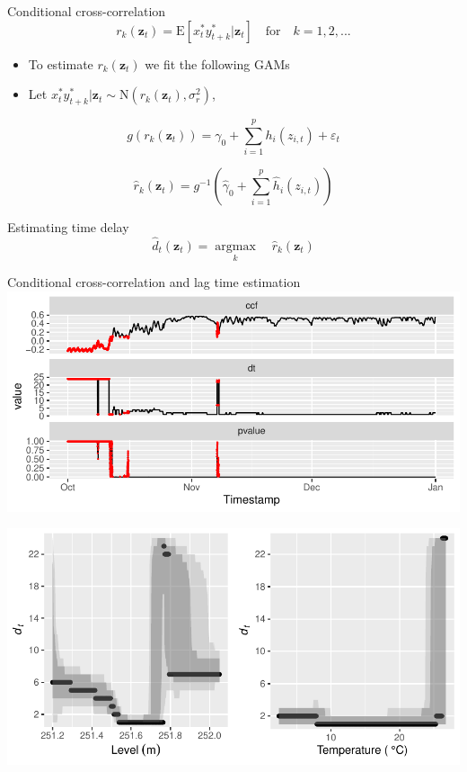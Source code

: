 \documentclass[14pt,ignorenonframetext,compress]{beamer}
\begin{document}
\begin{frame}
\begin{block}{Conditional cross-correlation}
\protect\hypertarget{conditional-cross-correlation}{}
\[
r_k(\bm{z}_t) = \text{E}[x_t^*y^*_{t+k}|\bm{z}_t] \quad \text{for} \quad k = 1,2,...
\]

\begin{itemize}
\item
  To estimate \(r_k(\bm{z}_t)\) we fit the following GAMs
\item
  Let
  \(x_t^*y^*_{t+k}|\bm{z}_t \sim \text{N}(r_k(\bm{z}_t), \sigma_r^2)\),
\end{itemize}

\[
g(r_k(\bm{z}_t)) = \gamma_0 + \sum_{i=1}^p h_i(z_{i,t}) + \varepsilon_t
\]

\[
\hat{r}_k(\bm{z}_t) = g^{-1}( \hat{\gamma}_0 + \sum_{i=1}^p \hat{h}_i(z_{i,t}))
\]
\end{block}

\begin{block}{Estimating time delay}
\protect\hypertarget{estimating-time-delay}{}
\[
\hat{d}_{t}(\bm{z}_t) = \underset{k}{\operatorname{argmax}}\quad \hat{r}_{k}(\bm{z}_t)
\]
\end{block}
\end{frame}

\begin{frame}{Conditional cross-correlation and lag time estimation}
\protect\hypertarget{conditional-cross-correlation-and-lag-time-estimation}{}
\includegraphics[width=1\linewidth]{plots/plot_ccf_dt_pval}
\end{frame}

\begin{frame}
\includegraphics[width=1\linewidth]{plots/vis_dt}
\end{frame}
\end{document}
